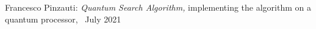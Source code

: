 \thispagestyle{empty}

\hfill

\vfill

\noindent Francesco Pinzauti: \textit{Quantum Search Algorithm,} implementing the algorithm on a quantum processor, \textcopyright\ July 2021